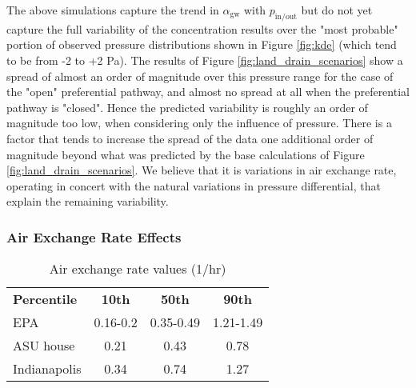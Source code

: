 \documentclass[journal=esthag,manuscript=article]{achemso}
\begin{document}
The above simulations capture the trend in $\alpha_\mathrm{gw}$ with $p_\mathrm{in/out}$ but do not yet capture the full variability of the concentration results over the "most probable" portion of observed pressure distributions shown in Figure \ref{fig:kde} (which tend to be from -2 to +2 Pa).
The results of Figure \ref{fig:land_drain_scenarios} show a spread of almost an order of magnitude over this pressure range for the case of the "open" preferential pathway, and almost no spread at all when the preferential pathway is "closed".
Hence the predicted variability is roughly an order of magnitude too low, when considering only the influence of pressure.
There is a factor that tends to increase the spread of the data one additional order of magnitude beyond what was predicted by the base calculations of Figure \ref{fig:land_drain_scenarios}.
We believe that it is variations in air exchange rate, operating in concert with the natural variations in pressure differential, that explain the remaining variability.\par

\subsubsection{Air Exchange Rate Effects}

\begin{table}[htb!]
 \caption{Air exchange rate values (1/hr)}\label{tbl:air_exchange_rate}
 \begin{tabular}{l c c c}
  \toprule
  \textbf{Percentile}                                                     & \textbf{10th} & \textbf{50th} & \textbf{90th} \\
  EPA\cite{u.s._epa_exposure_2011,m._d._koontz_estimation_1995}           & 0.16-0.2      & 0.35-0.49     & 1.21-1.49     \\
  ASU house\cite{holton_temporal_2013,guo_identification_2015}            & 0.21          & 0.43          & 0.78          \\
  Indianapolis\cite{u.s._environmental_protection_agency_assessment_2015} & 0.34          & 0.74          & 1.27          \\
  \bottomrule
 \end{tabular}
\end{table}
\end{document}
